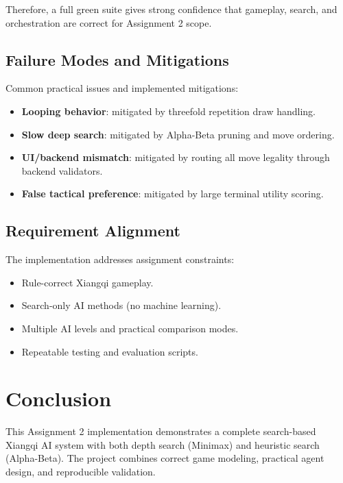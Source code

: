 \documentclass[a4paper,12pt]{article}
\begin{document}
Therefore, a full green suite gives strong confidence that gameplay, search, and orchestration are correct for Assignment 2 scope.

\subsection{Failure Modes and Mitigations}

Common practical issues and implemented mitigations:
\begin{itemize}
  \item \textbf{Looping behavior}: mitigated by threefold repetition draw handling.
  \item \textbf{Slow deep search}: mitigated by Alpha-Beta pruning and move ordering.
  \item \textbf{UI/backend mismatch}: mitigated by routing all move legality through backend validators.
  \item \textbf{False tactical preference}: mitigated by large terminal utility scoring.
\end{itemize}

\subsection{Requirement Alignment}

The implementation addresses assignment constraints:
\begin{itemize}
    \item Rule-correct Xiangqi gameplay.
    \item Search-only AI methods (no machine learning).
    \item Multiple AI levels and practical comparison modes.
    \item Repeatable testing and evaluation scripts.
\end{itemize}


\section{Conclusion}

This Assignment 2 implementation demonstrates a complete search-based Xiangqi AI system with both depth search (Minimax) and heuristic search (Alpha-Beta). The project combines correct game modeling, practical agent design, and reproducible validation.
\end{document}
